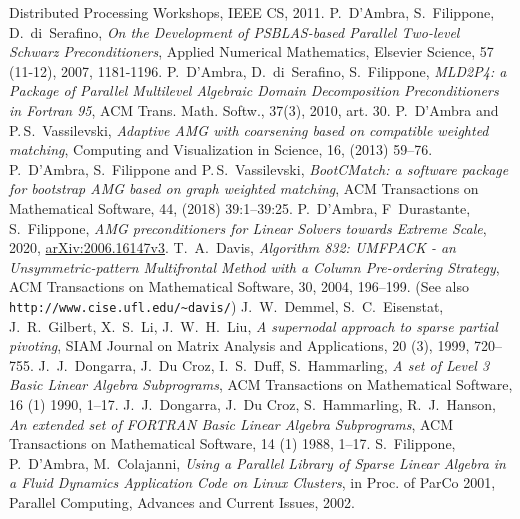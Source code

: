 \begin{thebibliography}{99}
Distributed Processing Workshops, IEEE CS, 2011.
%
%
P.~D'Ambra, S.~Filippone,  D.~di~Serafino,
{\em On the Development of PSBLAS-based Parallel Two-level Schwarz Preconditioners},
Applied Numerical Mathematics, Elsevier Science,
57 (11-12), 2007, 1181-1196.
%
P.~D'Ambra, D.~di~Serafino, S.~Filippone,
\emph{MLD2P4: a Package of Parallel Multilevel
Algebraic Domain Decomposition Preconditioners
in Fortran 95},  ACM Trans. Math. Softw., 37(3), 2010, art. 30.
%
P.~D'Ambra and P.\,S.~Vassilevski,
{\em Adaptive AMG with coarsening based on compatible weighted matching},
Computing and Visualization in Science, 16, (2013) 59--76.
%
P.~D'Ambra, S.~Filippone and P.\,S.~Vassilevski,
{\em BootCMatch: a software package for bootstrap AMG based on graph weighted matching},
ACM Transactions on Mathematical Software, 44, (2018) 39:1--39:25.
%
P.~D'Ambra, F~Durastante, S.~Filippone, 
\emph{AMG preconditioners for Linear Solvers towards Extreme Scale}, 2020, \href{https://arxiv.org/abs/2006.16147v3arXiv:2006.16147v2}{arXiv:2006.16147v3}.
%
T.~A.~Davis,
{\em Algorithm 832: UMFPACK - an Unsymmetric-pattern Multifrontal
Method with a Column Pre-ordering Strategy},
ACM Transactions on Mathematical Software, 30, 2004, 196--199.
(See also \texttt{http://www.cise.ufl.edu/{\textasciitilde}davis/})
%
J.~W.~Demmel, S.~C.~Eisenstat, J.~R.~Gilbert, X.~S.~Li, J.~W.~H.~Liu,
{\em A supernodal approach to sparse partial pivoting},
SIAM Journal on Matrix Analysis and Applications, 20 (3), 1999, 720--755.
%
J.~J.~Dongarra, J.~Du Croz, I.~S.~Duff, S.~Hammarling,
\emph{A set of Level 3 Basic Linear Algebra Subprograms},
ACM Transactions on Mathematical Software, 16 (1) 1990, 1--17.
%
J.~J.~Dongarra, J.~Du Croz, S.~Hammarling, R.~J.~Hanson,
\emph{An extended set of FORTRAN Basic Linear Algebra Subprograms},
ACM Transactions on Mathematical Software, 14 (1) 1988, 1--17.
%
%
%
S.~Filippone, P.~D'Ambra, M.~Colajanni,
{\em Using a Parallel Library of Sparse Linear Algebra in a Fluid Dynamics Application Code on Linux Clusters},
in Proc. of ParCo 2001, Parallel Computing, Advances and Current Issues, 2002.


\end{thebibliography}
